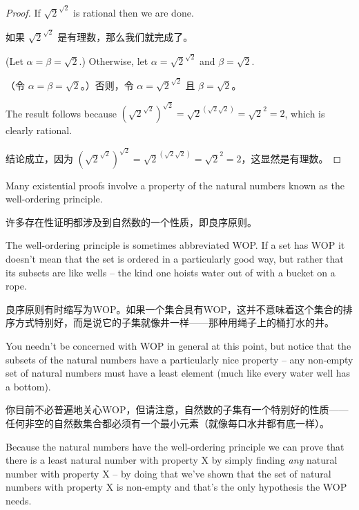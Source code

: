 \begin{proof}
      If $\sqrt{2}^{\sqrt{2}}$ is rational then we are done.

      如果 $\sqrt{2}^{\sqrt{2}}$ 是有理数，那么我们就完成了。

      (Let $ \alpha = \beta = \sqrt{2}$.)  Otherwise, let
      $\alpha = \sqrt{2}^{\sqrt{2}}$ and $\beta = \sqrt{2}$.

      （令 $ \alpha = \beta = \sqrt{2}$。）否则，令 $\alpha = \sqrt{2}^{\sqrt{2}}$ 且 $\beta = \sqrt{2}$。

      The result
      follows because $\left(\sqrt{2}^{\sqrt{2}}\right)^{\sqrt{2}} = \sqrt{2}^{(\sqrt{2}\sqrt{2})}
            = \sqrt{2}^2 = 2$, which is clearly rational.

      结论成立，因为 $\left(\sqrt{2}^{\sqrt{2}}\right)^{\sqrt{2}} = \sqrt{2}^{(\sqrt{2}\sqrt{2})} = \sqrt{2}^2 = 2$，这显然是有理数。
\end{proof}

Many existential proofs involve a property of the natural numbers
known as the well-ordering principle.

许多存在性证明都涉及到自然数的一个性质，即良序原则。

The well-ordering principle is
sometimes abbreviated WOP.  If a set has WOP it doesn't mean that the
set is ordered in a particularly good way, but rather that its subsets
are like wells -- the kind one hoists water out of with a bucket on a rope.

良序原则有时缩写为WOP。如果一个集合具有WOP，这并不意味着这个集合的排序方式特别好，而是说它的子集就像井一样——那种用绳子上的桶打水的井。

You needn't be concerned with WOP in general at this point, but notice
that the subsets of the natural numbers have a particularly nice property
-- any non-empty set of natural numbers must have a least element (much like
every water well has a bottom).

你目前不必普遍地关心WOP，但请注意，自然数的子集有一个特别好的性质——任何非空的自然数集合都必须有一个最小元素（就像每口水井都有底一样）。

Because the natural numbers have the well-ordering principle
we can prove that there is a least
natural number with property X by simply finding \emph{any} natural
number with property X -- by doing that we've shown that the set of
natural numbers with property X is non-empty and that's the only
hypothesis the WOP needs.

